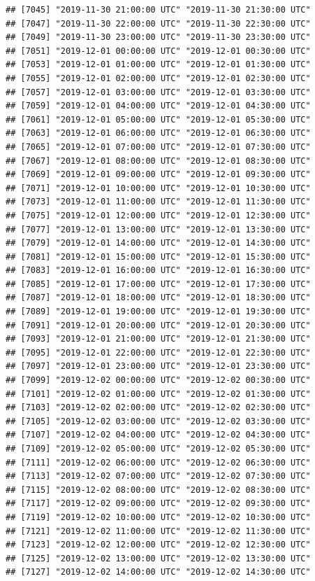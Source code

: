 \documentclass{article}\usepackage[]{graphicx}\usepackage[]{color}
\makeatletter
\newenvironment{kframe}{%
 \def\at@end@of@kframe{}%
 \ifinner\ifhmode%
  \def\at@end@of@kframe{\end{minipage}}%
  \begin{minipage}{\columnwidth}%
 \fi\fi%
 \def\FrameCommand##1{\hskip\@totalleftmargin \hskip-\fboxsep
 \colorbox{shadecolor}{##1}\hskip-\fboxsep
     \hskip-\linewidth \hskip-\@totalleftmargin \hskip\columnwidth}%
 \MakeFramed {\advance\hsize-\width
   \@totalleftmargin\z@ \linewidth\hsize
   \@setminipage}}%
 {\par\unskip\endMakeFramed%
 \at@end@of@kframe}
\newenvironment{knitrout}{}{} %
\makeatother
\begin{document}
\begin{knitrout}
\begin{kframe}
\begin{verbatim}
## [7045] "2019-11-30 21:00:00 UTC" "2019-11-30 21:30:00 UTC"
## [7047] "2019-11-30 22:00:00 UTC" "2019-11-30 22:30:00 UTC"
## [7049] "2019-11-30 23:00:00 UTC" "2019-11-30 23:30:00 UTC"
## [7051] "2019-12-01 00:00:00 UTC" "2019-12-01 00:30:00 UTC"
## [7053] "2019-12-01 01:00:00 UTC" "2019-12-01 01:30:00 UTC"
## [7055] "2019-12-01 02:00:00 UTC" "2019-12-01 02:30:00 UTC"
## [7057] "2019-12-01 03:00:00 UTC" "2019-12-01 03:30:00 UTC"
## [7059] "2019-12-01 04:00:00 UTC" "2019-12-01 04:30:00 UTC"
## [7061] "2019-12-01 05:00:00 UTC" "2019-12-01 05:30:00 UTC"
## [7063] "2019-12-01 06:00:00 UTC" "2019-12-01 06:30:00 UTC"
## [7065] "2019-12-01 07:00:00 UTC" "2019-12-01 07:30:00 UTC"
## [7067] "2019-12-01 08:00:00 UTC" "2019-12-01 08:30:00 UTC"
## [7069] "2019-12-01 09:00:00 UTC" "2019-12-01 09:30:00 UTC"
## [7071] "2019-12-01 10:00:00 UTC" "2019-12-01 10:30:00 UTC"
## [7073] "2019-12-01 11:00:00 UTC" "2019-12-01 11:30:00 UTC"
## [7075] "2019-12-01 12:00:00 UTC" "2019-12-01 12:30:00 UTC"
## [7077] "2019-12-01 13:00:00 UTC" "2019-12-01 13:30:00 UTC"
## [7079] "2019-12-01 14:00:00 UTC" "2019-12-01 14:30:00 UTC"
## [7081] "2019-12-01 15:00:00 UTC" "2019-12-01 15:30:00 UTC"
## [7083] "2019-12-01 16:00:00 UTC" "2019-12-01 16:30:00 UTC"
## [7085] "2019-12-01 17:00:00 UTC" "2019-12-01 17:30:00 UTC"
## [7087] "2019-12-01 18:00:00 UTC" "2019-12-01 18:30:00 UTC"
## [7089] "2019-12-01 19:00:00 UTC" "2019-12-01 19:30:00 UTC"
## [7091] "2019-12-01 20:00:00 UTC" "2019-12-01 20:30:00 UTC"
## [7093] "2019-12-01 21:00:00 UTC" "2019-12-01 21:30:00 UTC"
## [7095] "2019-12-01 22:00:00 UTC" "2019-12-01 22:30:00 UTC"
## [7097] "2019-12-01 23:00:00 UTC" "2019-12-01 23:30:00 UTC"
## [7099] "2019-12-02 00:00:00 UTC" "2019-12-02 00:30:00 UTC"
## [7101] "2019-12-02 01:00:00 UTC" "2019-12-02 01:30:00 UTC"
## [7103] "2019-12-02 02:00:00 UTC" "2019-12-02 02:30:00 UTC"
## [7105] "2019-12-02 03:00:00 UTC" "2019-12-02 03:30:00 UTC"
## [7107] "2019-12-02 04:00:00 UTC" "2019-12-02 04:30:00 UTC"
## [7109] "2019-12-02 05:00:00 UTC" "2019-12-02 05:30:00 UTC"
## [7111] "2019-12-02 06:00:00 UTC" "2019-12-02 06:30:00 UTC"
## [7113] "2019-12-02 07:00:00 UTC" "2019-12-02 07:30:00 UTC"
## [7115] "2019-12-02 08:00:00 UTC" "2019-12-02 08:30:00 UTC"
## [7117] "2019-12-02 09:00:00 UTC" "2019-12-02 09:30:00 UTC"
## [7119] "2019-12-02 10:00:00 UTC" "2019-12-02 10:30:00 UTC"
## [7121] "2019-12-02 11:00:00 UTC" "2019-12-02 11:30:00 UTC"
## [7123] "2019-12-02 12:00:00 UTC" "2019-12-02 12:30:00 UTC"
## [7125] "2019-12-02 13:00:00 UTC" "2019-12-02 13:30:00 UTC"
## [7127] "2019-12-02 14:00:00 UTC" "2019-12-02 14:30:00 UTC"

\end{verbatim}
\end{kframe}
\end{knitrout}
\end{document}
